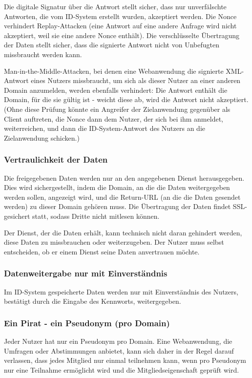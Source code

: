 \documentclass[parskip=half]{scrartcl}
\begin{document}
Die digitale Signatur über die Antwort stellt sicher, dass nur unverfälschte Antworten, die vom ID-System erstellt wurden, akzeptiert werden.
Die Nonce verhindert Replay-Attacken (eine Antwort auf eine andere Anfrage wird nicht akzeptiert, weil sie eine andere Nonce enthält).
Die verschlüsselte Übertragung der Daten stellt sicher, dass die signierte Antwort nicht von Unbefugten missbraucht werden kann.

Man-in-the-Middle-Attacken, bei denen eine Webanwendung die signierte XML-Antwort eines Nutzers missbraucht,
um sich als dieser Nutzer an einer anderen Domain anzumelden, werden ebenfalls verhindert:
Die Antwort enthält die Domain, für die sie gültig ist - weicht diese ab, wird die Antwort nicht akzeptiert.
(Ohne diese Prüfung könnte ein Angreifer der Zielanwendung gegenüber als Client auftreten, die Nonce dann dem Nutzer, der sich bei ihm anmeldet, weiterreichen,
und dann die ID-System-Antwort des Nutzers an die Zielanwendung schicken.)


\subsubsection{Vertraulichkeit der Daten}
Die freigegebenen Daten werden nur an den angegebenen Dienst herausgegeben.
Dies wird sichergestellt, indem die Domain, an die die Daten weitergegeben werden sollen, angezeigt wird,
und die Return-URL (an die die Daten gesendet werden) zu dieser Domain gehören muss.
Die Übertragung der Daten findet SSL-gesichert statt, sodass Dritte nicht mitlesen können.

Der Dienst, der die Daten erhält, kann technisch nicht daran gehindert werden, diese Daten zu missbrauchen oder weiterzugeben.
Der Nutzer muss selbst entscheiden, ob er einem Dienst seine Daten anvertrauen möchte.

\subsubsection{Datenweitergabe nur mit Einverständnis}
Im ID-System gespeicherte Daten werden nur mit Einverständnis des Nutzers, bestätigt durch die Eingabe des Kennworts, weitergegeben.

\subsubsection{Ein Pirat - ein Pseudonym (pro Domain)}
Jeder Nutzer hat nur ein Pseudonym pro Domain.
Eine Webanwendung, die Umfragen oder Abstimmungen anbietet, kann sich daher in der Regel darauf verlassen, dass jedes Mitglied nur einmal teilnehmen kann,
wenn pro Pseudonym nur eine Teilnahme ermöglicht wird und die Mitgliedseigenschaft geprüft wird.
\end{document}
